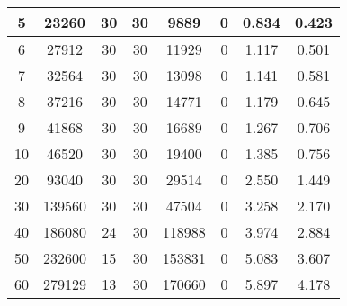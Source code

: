\documentclass{acmsiggraph}
\begin{document}
\begin{table}[h]
\begin{tabular}{|c|c|c|c|c|c|c|c|}
    \hline                                                                             
                    5  & 23260                  & 30 & 30                  & 9889  & 0                                     & 0.834 & 0.423                              \\   
    \hline                                                                             
                    6  & 27912                  & 30 & 30                  & 11929 & 0                                     & 1.117 & 0.501                              \\   
    \hline                      
                    7  & 32564                  & 30 & 30                  & 13098 & 0                                     & 1.141 & 0.581                              \\   
    \hline                      
                    8  & 37216                  & 30 & 30                  & 14771 & 0                                     & 1.179 & 0.645                              \\   
    \hline                      
                    9  & 41868                  & 30 & 30                  & 16689 & 0                                     & 1.267 & 0.706                              \\   
    \hline                      
                    10 & 46520                  & 30 & 30                  & 19400 & 0                                     & 1.385 & 0.756                              \\   
    \hline
                    20 & 93040                  & 30 & 30                  & 29514 & 0                                     & 2.550 & 1.449                              \\   
    \hline
                    30 & 139560                 & 30 & 30                  & 47504 & 0                                     & 3.258 & 2.170                              \\   
    \hline
                    40 & 186080                 & 24 & 30                  & 118988& 0                                     & 3.974 & 2.884                              \\   
    \hline
                    50 & 232600                 & 15 & 30                  & 153831& 0                                     & 5.083 & 3.607                              \\   
    \hline
                    60 & 279129                 & 13 & 30                  & 170660& 0                                     & 5.897 & 4.178                              \\   

\end{tabular}
\end{table}
\end{document}
